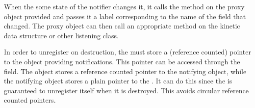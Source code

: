 When the some state of the notifier changes it, it calls the
 method on the proxy object provided and passes
it a label corresponding to the name of the field that changed. The
proxy object can then call an appropriate method on the kinetic data
structure or other listening class.

In order to unregister on destruction, the  must store a
(reference counted) pointer to the object providing
notifications. This pointer can be accessed through the 
field. The  object stores a reference counted pointer to
the notifying object, while the notifying object stores a plain
pointer to the . It can do this since the 
is guaranteed to unregister itself when it is destroyed. This avoids
circular reference counted pointers.

